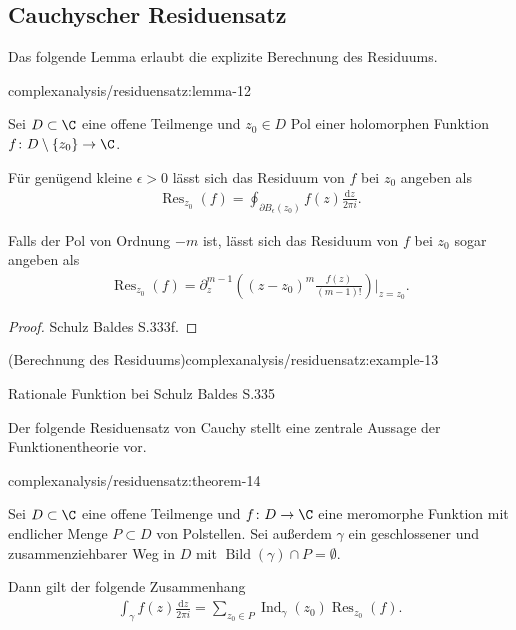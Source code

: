 \documentclass[letterpaper,10pt,german]{jupyterBook}
\begin{document}
\subsection{Cauchyscher Residuensatz}
\label{\detokenize{complexanalysis/residuensatz:cauchyscher-residuensatz}}
\par
Das folgende Lemma erlaubt die explizite Berechnung des Residuums.
\begin{lemma}{}{complexanalysis/residuensatz:lemma-12}



\par
Sei \(D \subset \C\) eine offene Teilmenge und \(z_0 \in D\) Pol einer holomorphen Funktion \(f \colon D \setminus \{z_0\} \rightarrow \C\).

\par
Für genügend kleine \(\epsilon > 0\) lässt sich das Residuum von \(f\) bei \(z_0\) angeben als
\begin{align*}
\operatorname{Res}_{z_0}(f) = \oint_{\partial B_\epsilon(z_0)} f(z) \frac{\mathrm{d}z}{2\pi i}.
\end{align*}
\par
Falls der Pol von Ordnung \(-m\) ist, lässt sich das Residuum von \(f\) bei \(z_0\) sogar angeben als
\begin{align*}
\operatorname{Res}_{z_0}(f) = \partial_z^{m-1}\left( (z-z_0)^m \frac{f(z)}{(m-1)!}\right)|_{z=z_0}.
\end{align*}\end{lemma}

\begin{proof}
 Schulz Baldes S.333f.
\end{proof}
\begin{example}{(Berechnung des Residuums)}{complexanalysis/residuensatz:example-13}



\par
Rationale Funktion bei Schulz Baldes S.335
\end{example}

\par
Der folgende Residuensatz von Cauchy stellt eine zentrale Aussage der Funktionentheorie vor.
\begin{theorem}{}{complexanalysis/residuensatz:theorem-14}



\par
Sei \(D \subset \C\) eine offene Teilmenge und \(f \colon D \rightarrow \C\) eine meromorphe Funktion mit endlicher Menge \(P \subset D\) von Polstellen.
Sei außerdem \(\gamma\) ein geschlossener und zusammenziehbarer Weg in \(D\) mit \(\operatorname{Bild}(\gamma) \cap P = \emptyset\).

\par
Dann gilt der folgende Zusammenhang
\begin{align*}
\int_\gamma f(z) \frac{\mathrm{d}z}{2\pi i} = \sum_{z_0 \in P} \operatorname{Ind}_\gamma(z_0) \operatorname{Res}_{z_0}(f).
\end{align*}\end{theorem}
\end{document}

